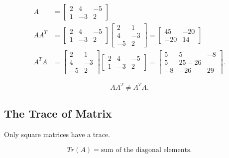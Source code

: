 \documentclass{article}
\begin{document}
\begin{example}
    \begin{align*}
        A &=
        \begin{bmatrix} 2&4&-5\\1&-3&2 \end{bmatrix} \\
        AA^T &=
        \begin{bmatrix} 2&4&-5\\1&-3&2 \end{bmatrix} 
        \begin{bmatrix} 2&1\\4&-3\\-5&2 \end{bmatrix} 
        =
        \begin{bmatrix} 45&-20\\-20&14 \end{bmatrix} \\
        A^TA &=
        \begin{bmatrix} 2&1\\4&-3\\-5&2 \end{bmatrix} 
        \begin{bmatrix} 2&4&-5\\1&-3&2 \end{bmatrix} 
        =
        \begin{bmatrix} 
            5&5&-8\\
            5&25-26\\
            -8&-26&29
        \end{bmatrix} 
    .\end{align*}
\end{example}

\begin{note}
    \[
        AA^T \neq A^TA
    .\] 
\end{note}

\subsection{The Trace of Matrix}
Only square matrices have a trace.

\begin{definition}
    \[
        Tr(A) = \text{sum of the diagonal elements}
    .\] 
\end{definition}
\end{document}
